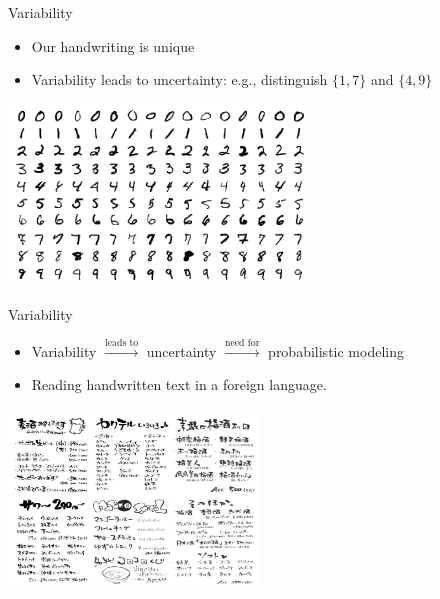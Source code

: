 \documentclass{beamer}
\begin{document}
\begin{frame}{Variability}
\begin{itemize}
  \item Our handwriting is unique
  \item Variability leads to uncertainty: e.g., distinguish $\{1,7\}$ and $\{4,9\}$
\end{itemize}
\begin{center}
  \includegraphics[width=0.6\textwidth]{handwriting_example.png}
\end{center}
\end{frame}

\begin{frame}{Variability}
\begin{itemize}
\item Variability $\xrightarrow{\text{leads to}}$ uncertainty $\xrightarrow{\text{need for}}$ probabilistic modeling
  \item Reading handwritten text in a foreign language.
\end{itemize}
\begin{center}
  \includegraphics[width=0.5\textwidth]{foreign_handwriting.png}
\end{center}
\end{frame}
\end{document}
